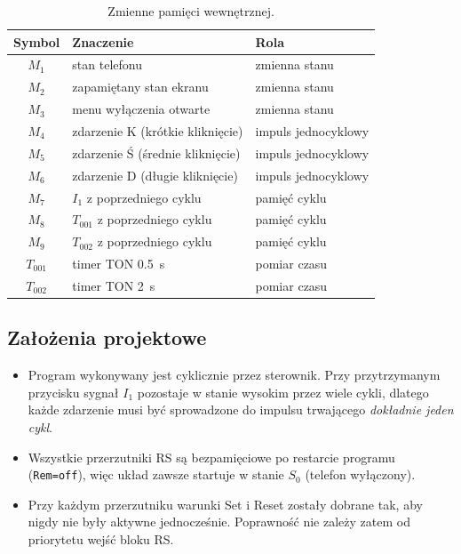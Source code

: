 \begin{table}[H]
\centering
\caption{Zmienne pamięci wewnętrznej.}
\label{tab:pamiec}
\begin{tabular}{cll}
\toprule
Symbol & Znaczenie & Rola \\
\midrule
$M_1$ & stan telefonu & zmienna stanu \\
$M_2$ & zapamiętany stan ekranu & zmienna stanu \\
$M_3$ & menu wyłączenia otwarte & zmienna stanu \\
$M_4$ & zdarzenie K (krótkie kliknięcie) & impuls jednocyklowy \\
$M_5$ & zdarzenie Ś (średnie kliknięcie) & impuls jednocyklowy \\
$M_6$ & zdarzenie D (długie kliknięcie) & impuls jednocyklowy \\
$M_7$ & $I_1$ z poprzedniego cyklu & pamięć cyklu \\
$M_8$\footnotemark & $T_{001}$ z poprzedniego cyklu & pamięć cyklu \\
$M_9$ & $T_{002}$ z poprzedniego cyklu & pamięć cyklu \\
$T_{001}$ & timer TON \SI{0,5}{\second} & pomiar czasu \\
$T_{002}$ & timer TON \SI{2}{\second} & pomiar czasu \\
\bottomrule
\end{tabular}
\end{table}

\subsection{Założenia projektowe}
\begin{itemize}
    \item Program wykonywany jest cyklicznie przez sterownik. Przy
          przytrzymanym przycisku sygnał $I_1$ pozostaje w stanie
          wysokim przez wiele cykli, dlatego każde zdarzenie musi być
          sprowadzone do impulsu trwającego \emph{dokładnie jeden
          cykl}.
    \item Wszystkie przerzutniki RS są bezpamięciowe po restarcie
          programu (\texttt{Rem=off}), więc układ zawsze startuje
          w stanie $S_0$ (telefon wyłączony).
    \item Przy każdym przerzutniku warunki Set i Reset zostały
          dobrane tak, aby nigdy nie były aktywne jednocześnie.
          Poprawność nie zależy zatem od priorytetu wejść bloku RS.
\end{itemize}
